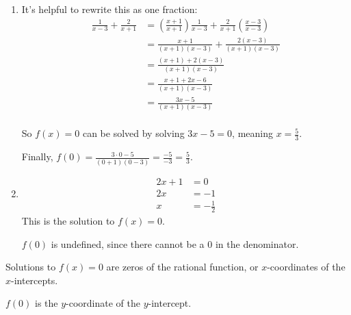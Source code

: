 \documentclass[noauthor]{ximera}
\begin{document}
\begin{problem}
\begin{explanation}
\begin{enumerate}
    \(f(0) = \frac{0 + 1}{0^2 - 1} = \frac{1}{-1} = -1\)

    \item It's helpful to rewrite this as one fraction:
    \begin{align*}
        \frac{1}{x - 3} + \frac{2}{x + 1} & = \left(\frac{x + 1}{x + 1}\right)\frac{1}{x - 3} + \frac{2}{x + 1} \left(\frac{x - 3}{x - 3}\right) \\
        & = \frac{x + 1}{(x + 1)(x - 3)} + \frac{2(x - 3)}{(x + 1)(x - 3)} \\
        & = \frac{(x + 1) + 2(x - 3)}{(x + 1)(x - 3)} \\
        & = \frac{x + 1 + 2x - 6}{(x + 1)(x - 3)} \\
        & = \frac{3x - 5}{(x + 1)(x - 3)} \\
    \end{align*}

    So \(f(x) = 0\) can be solved by solving \(3x - 5 = 0\), meaning \(x = \frac{5}{3}\).

    Finally, \(f(0) = \frac{3 \cdot 0 - 5}{(0 + 1)(0 - 3)} = \frac{-5}{-3} = \frac{5}{3}\).

    \item 
    \begin{align*}
        2x + 1 & = 0 \\
        2x & = -1 \\
        x & = -\frac{1}{2}
    \end{align*}
    This is the solution to \(f(x) = 0\). 

    \(f(0)\) is undefined, since there cannot be a 0 in the denominator.
\end{enumerate}

Solutions to \(f(x) = 0\) are zeros of the rational function, or \(x\)-coordinates of the \(x\)-intercepts.

\(f(0)\) is the \(y\)-coordinate of the \(y\)-intercept.
\end{explanation}
\end{problem}
\end{document}
